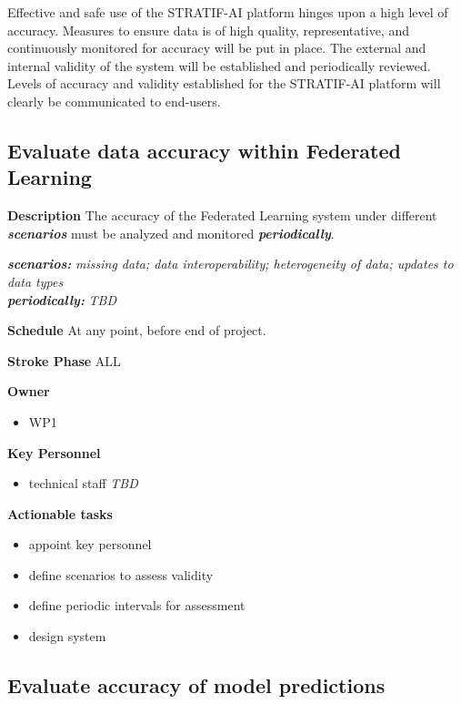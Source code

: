 \documentclass[
  letterpaper,
  DIV=11,
  numbers=noendperiod]{scrreport}
\providecommand{\tightlist}{%
  \setlength{\itemsep}{0pt}\setlength{\parskip}{0pt}}\usepackage{longtable,booktabs,array}
\begin{document}
Effective and safe use of the STRATIF-AI platform hinges upon a high
level of accuracy. Measures to ensure data is of high quality,
representative, and continuously monitored for accuracy will be put in
place. The external and internal validity of the system will be
established and periodically reviewed. Levels of accuracy and validity
established for the STRATIF-AI platform will clearly be communicated to
end-users.

\hypertarget{evaluate-data-accuracy-within-federated-learning}{%
\subsection{Evaluate data accuracy within Federated
Learning}\label{evaluate-data-accuracy-within-federated-learning}}

\textbf{Description} The accuracy of the Federated Learning system under
different \textbf{\emph{scenarios}} must be analyzed and monitored
\textbf{\emph{periodically}}.

\textbf{\emph{scenarios:}} \emph{missing data; data interoperability;
heterogeneity of data; updates to data types}\\
\textbf{\emph{periodically:}} \emph{TBD}

\textbf{Schedule} At any point, before end of project.

\textbf{Stroke Phase} ALL

\textbf{Owner}

\begin{itemize}
\tightlist
\item
  WP1
\end{itemize}

\textbf{Key Personnel}

\begin{itemize}
\tightlist
\item
  technical staff \emph{TBD}
\end{itemize}

\textbf{Actionable tasks}

\begin{itemize}
\tightlist
\item
  appoint key personnel
\item
  define scenarios to assess validity
\item
  define periodic intervals for assessment
\item
  design system
\end{itemize}

\hypertarget{evaluate-accuracy-of-model-predictions}{%
\subsection{Evaluate accuracy of model
predictions}\label{evaluate-accuracy-of-model-predictions}}
\end{document}
